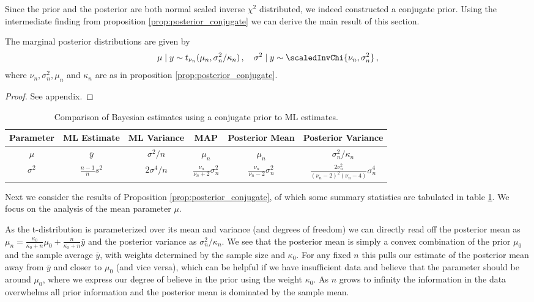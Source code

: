Since the prior and the posterior are both normal scaled inverse $\chi^2$ distributed, we indeed constructed a conjugate prior.
Using the intermediate finding from proposition \ref{prop:posterior_conjugate} we can derive the main result of this section.

\begin{proposition}\label{prop:marginal_posterior}
  The marginal posterior distributions are given by
  \begin{align*}
    \mu \mid y \sim t_{\nu_n}(\mu_n, \sigma_n^2 / \kappa_n)\,, \quad \sigma^2 \mid y \sim \scaledInvChi{\nu_n, \sigma_n^2}\,,
  \end{align*}
  where $\nu_n, \sigma_n^2, \mu_n$ and $\kappa_n$ are as in proposition \ref{prop:posterior_conjugate}.
\end{proposition}
\begin{proof}
  See appendix.
\end{proof}

\begin{table}[ht]
\centering
\def\arraystretch{1.3}
{\small
 \begin{tabular}{c | c c c c c}
 Parameter & ML Estimate & ML Variance & MAP & Posterior Mean & Posterior Variance\\
 \hline
 $\mu$ & $\bar{y}$ & $\sigma^2 / n$ & $\mu_n$ & $\mu_n$ & $\sigma_n^2 / \kappa_n$\\
 $\sigma^2$ & $\frac{n-1}{n}s^2$ & $2 \sigma^4 / n$ & $\frac{\nu_n}{\nu_n + 2} \sigma_n^2$ & $\frac{\nu_n}{\nu_n - 2} \sigma_n^2$ & $\frac{2 \nu_n^2}{(\nu_n - 2)^2(\nu_n - 4)} \sigma_n^4$
 \end{tabular}
 }
\caption{{\small Comparison of Bayesian estimates using a conjugate prior to ML estimates.}}
\label{tab:comp_conjugate_bay_ml}
\end{table}


Next we consider the results of Proposition \ref{prop:posterior_conjugate}, of which some summary statistics are tabulated in table \ref{tab:comp_conjugate_bay_ml}.
We focus on the analysis of the mean parameter $\mu$.

As the t-distribution is parameterized over its mean and variance (and degrees of freedom) we can directly read off the posterior mean as $\mu_n =\frac{\kappa_0}{\kappa_0 + n}\mu_0 + \frac{n}{\kappa_0 + n}\bar{y}$ and the posterior variance as $\sigma_n^2 / \kappa_n$.
We see that the posterior mean is simply a convex combination of the prior $\mu_0$ and the sample average $\bar{y}$, with weights determined by the sample size and $\kappa_0$.
For any fixed $n$ this pulls our estimate of the posterior mean away from $\bar{y}$ and closer to $\mu_0$ (and vice versa), which can be helpful if we have insufficient data and believe that the parameter should be around $\mu_0$, where we express our degree of believe in the prior using the weight $\kappa_0$.
As $n$ grows to infinity the information in the data overwhelms all prior information and the posterior mean is dominated by the sample mean.

